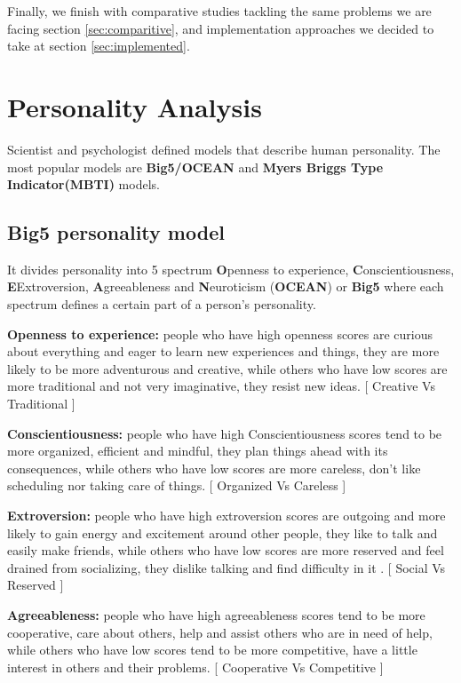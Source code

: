 Finally, we finish with comparative studies tackling the same problems we are facing section \ref{sec:comparitive}, and implementation approaches we decided to take at section \ref{sec:implemented}.

\section{Personality Analysis}
\label{Personality Analysis}
Scientist and psychologist defined models that describe human personality. The most popular models are \textbf{Big5/OCEAN} and  \textbf{Myers Briggs Type Indicator(MBTI)} models.

\subsection{Big5 personality model}
It divides personality into 5 spectrum \textbf{O}penness to experience, \textbf{C}onscientiousness, \textbf{E}Extroversion, \textbf{A}greeableness and \textbf{N}euroticism (\textbf{OCEAN}) or \textbf{Big5} where each spectrum defines a certain part of a person's personality.\cite{big5}\newline

\textbf{Openness to experience: }people who have high openness scores are curious about everything and eager to learn new experiences and things, they are more likely to be more adventurous and creative, while others who have low scores are more traditional and not very imaginative, they resist new ideas. [ Creative Vs Traditional ]\newline

\textbf{Conscientiousness: }people who have high Conscientiousness scores tend to be more organized, efficient and mindful, they plan things ahead with its consequences, while others who have low scores are more careless, don’t like scheduling nor taking care of things. [ Organized Vs Careless ] \newline

\textbf{Extroversion: }people who have high extroversion scores are outgoing and more likely to gain energy and excitement around other people, they like to talk and easily make friends, while others who have low scores are more reserved and feel drained from socializing, they dislike talking and find difficulty in it . [ Social Vs Reserved ]\newline

\textbf{Agreeableness: }people who have high agreeableness scores tend to be more cooperative, care about others, help and assist others who are in need of help, while others who have low scores tend to be more competitive, have a little interest in others and their problems. [ Cooperative Vs Competitive ]\newline

